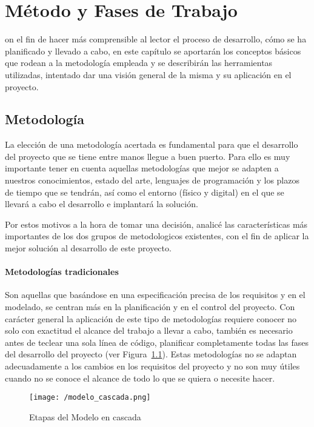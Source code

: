 \chapter{Método y Fases de Trabajo}
\label{chap:metodologia}

on el fin de hacer más comprensible al lector el proceso de desarrollo, cómo se ha planificado y llevado a cabo, en este capítulo se aportarán los conceptos básicos que rodean a la metodología empleada y se describirán las herramientas utilizadas, intentado dar una visión general de la misma y su aplicación en el proyecto.

\section{Metodología}

La elección de una metodología acertada es fundamental para que el desarrollo del proyecto que se tiene entre manos llegue a buen puerto. Para ello es muy importante tener en cuenta aquellas metodologías que mejor se adapten a nuestros conocimientos, estado del arte, lenguajes de programación y los plazos de tiempo que se tendrán, así como el entorno (físico y digital) en el que se llevará a cabo el desarrollo e implantará la solución. 

Por estos motivos a la hora de tomar una decisión, analicé las características más importantes de los dos grupos de metodologicos existentes, con el fin de aplicar la mejor solución al desarrollo de este proyecto.

\subsubsection{Metodologías tradicionales}

Son aquellas que basándose en una especificación precisa de los requisitos y en el modelado, se centran más en la planificación y en el control del proyecto. Con carácter general la aplicación de este tipo de metodologías requiere conocer no solo con exactitud el alcance del trabajo a llevar a cabo, también es necesario antes de teclear una sola línea de código, planificar completamente todas las fases del desarrollo del proyecto (ver Figura~\ref{fig:modelo-en-cascada}). Estas metodologías no se adaptan adecuadamente a los cambios en los requisitos del proyecto y no son muy útiles cuando no se conoce el alcance de todo lo que se quiera o necesite hacer.

\begin{figure}[h]
\centering
\texttt{[image: /modelo\_cascada.png]}
\caption{Etapas del Modelo en cascada~\cite{iso_enfoque_practico}}
\label{fig:modelo-en-cascada}
\end{figure}

